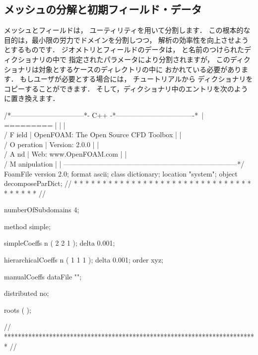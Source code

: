 \subsection{メッシュの分解と初期フィールド・データ}
\label{ssec:3.4.1}
%
%
%
%
メッシュとフィールドは，
%
%
ユーティリティを用いて分割します．
この根本的な目的は，最小限の労力でドメインを分割しつつ，
解析の効率性を向上させようとするものです．
ジオメトリとフィールドのデータは，
%
%
と名前のつけられたディクショナリの中で
指定されたパラメータにより分割されますが，
このディクショナリは対象とするケースのディレクトリの中に
おかれている必要があります．
もしユーザが必要とする場合には，
チュートリアルから
ディクショナリをコピーすることができます．
そして，ディクショナリ中のエントリを次のように置き換えます．
\begin{OFverbatim}[file, linenum=17]
/*--------------------------------*- C++ -*----------------------------------*\
| =========                 |                                                 |
| \\      /  F ield         | OpenFOAM: The Open Source CFD Toolbox           |
|  \\    /   O peration     | Version:  2.0.0                                 |
|   \\  /    A nd           | Web:      www.OpenFOAM.com                      |
|    \\/     M anipulation  |                                                 |
\*---------------------------------------------------------------------------*/
FoamFile
{
    version     2.0;
    format      ascii;
    class       dictionary;
    location    "system";
    object      decomposeParDict;
}
// * * * * * * * * * * * * * * * * * * * * * * * * * * * * * * * * * * * * * //

numberOfSubdomains 4;

method          simple;

simpleCoeffs
{
    n               ( 2 2 1 );
    delta           0.001;
}

hierarchicalCoeffs
{
    n               ( 1 1 1 );
    delta           0.001;
    order           xyz;
}

manualCoeffs
{
    dataFile        "";
}

distributed     no;

roots           ( );


// ************************************************************************* //
\end{OFverbatim}
